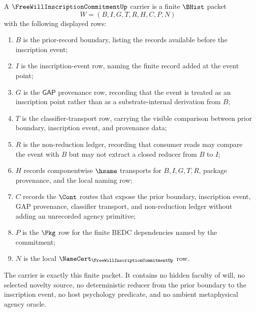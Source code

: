 \begin{definition}
\label{def:free-will-inscription-commitment-carrier}
A $\FreeWillInscriptionCommitmentUp$ carrier is a finite $\BHist$ packet
$$
W=(B,I,G,T,R,H,C,P,N)
$$
with the following displayed rows:
\begin{enumerate}
\item $B$ is the prior-record boundary, listing the records available before the inscription event;
\item $I$ is the inscription-event row, naming the finite record added at the event point;
\item $G$ is the $\mathsf{GAP}$ provenance row, recording that the event is treated as an inscription point rather than as a substrate-internal derivation from $B$;
\item $T$ is the classifier-transport row, carrying the visible comparison between prior boundary, inscription event, and provenance data;
\item $R$ is the non-reduction ledger, recording that consumer reads may compare the event with $B$ but may not extract a closed reducer from $B$ to $I$;
\item $H$ records componentwise $\hsame$ transports for $B,I,G,T,R$, package provenance, and the local naming row;
\item $C$ records the $\Cont$ routes that expose the prior boundary, inscription event, GAP provenance, classifier transport, and non-reduction ledger without adding an unrecorded agency primitive;
\item $P$ is the $\Pkg$ row for the finite BEDC dependencies named by the commitment;
\item $N$ is the local $\NameCert_{\FreeWillInscriptionCommitmentUp}$ row.
\end{enumerate}
The carrier is exactly this finite packet. It contains no hidden faculty of will, no selected novelty source, no deterministic reducer from the prior boundary to the inscription event, no host psychology predicate, and no ambient metaphysical agency oracle.
\end{definition}

